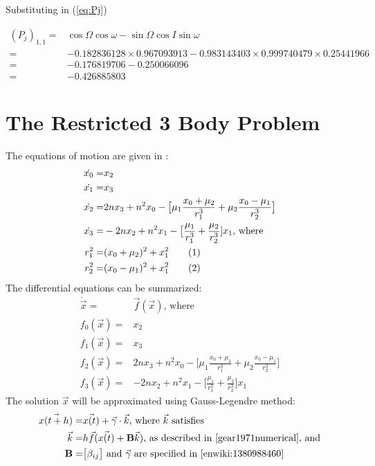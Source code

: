 \documentclass[]{article}
\newcommand\numberthis{\addtocounter{equation}{1}\tag{\theequation}}
\begin{document}
Substituting in (\ref{eq:Pj})

\begin{align*}
(P_j)_{1,1} =& \cos \Omega \cos \omega - \sin \Omega \cos I \sin \omega \\
=& -0.182836128 \times 	0.967093913 - 0.983143403 \times 0.999740479 \times 	0.25441966\\
=& -0.176819706 - 0.250066096\\
=& -0.426885803
\end{align*}

\section{The Restricted 3 Body Problem}


The equations of motion are given in \cite[(3.16-17)]{ssd}:
\begin{align*}
	\dot{x_0} =& x_2\\
	\dot{x_1} =& x_3\\
	\dot{x_2} =& 2nx_3 + n^2x_0-\big[\mu_1\frac{x_0+\mu_2}{r_1^3} + \mu_2\frac{x_0-\mu_1}{r_2^3}\big]\\
	\dot{x_3} =& -2nx_2 + n^2x_1 - \big[\frac{\mu_1}{r_1^3} + \frac{\mu_2}{r_2^3}]x_1\text{, where}\\
	r_1^2 =& (x_0+\mu_2)^2 + x_1^2 \numberthis \label{eq:def:r1}\\
	r_2^2 =& (x_0-\mu_1)^2 + x_1^2  \numberthis \label{eq:def:r2}
\end{align*}
The differential equations can be summarized:
\begin{align*}
	\dot{\vec{x}} =& \vec{f}(\vec{x}) \text{, where}\\
	f_0(\vec{x}) =& x_2\\
	f_1(\vec{x}) =& x_3\\
	f_2(\vec{x}) =& 2nx_3 + n^2x_0-\big[\mu_1\frac{x_0+\mu_2}{r_1^3} + \mu_2\frac{x_0-\mu_1}{r_2^3}\big]\\
	f_3(\vec{x}) =& -2nx_2 + n^2x_1 - \big[\frac{\mu_1}{r_1^3} + \frac{\mu_2}{r_2^3}]x_1
\end{align*}
The solution $\vec{x}$ will be approximated using Gauss-Legendre method\cite{enwiki:1380988460}:
\begin{align*}
		\vec{x(t+h)} =& \vec{x(t)} + \vec{\gamma} \cdot \vec{k} \text{, where $\vec{k}$ satisfies}\\
		\vec{k} =& h \vec{f} (\vec{x(t)} + \mathbf{B} \vec{k}) \text{, as described in \cite{gear1971numerical}, and}\\
		 \mathbf{B}=&\big[\beta_{ij}\big] \text{ and $\vec{\gamma}$ are specified in \cite{enwiki:1380988460}}
\end{align*}
\end{document}
